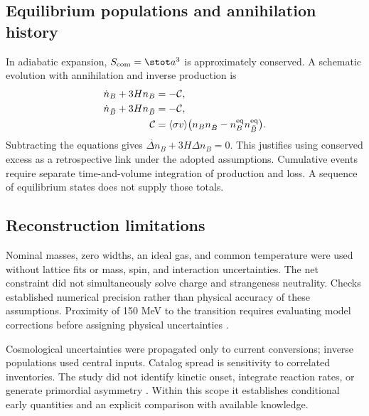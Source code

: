 \subsection{Equilibrium populations and annihilation history}
In adiabatic expansion, $S_{\rm com}=\stot a^3$ is approximately conserved. A schematic evolution with annihilation and inverse production is \citep{Satarov2013}
\begin{align}
\dot n_B+3Hn_B&=-\mathcal C,\\
\dot n_{\bar B}+3Hn_{\bar B}&=-\mathcal C,\\
\mathcal C&=\langle\sigma v\rangle
\bigl(n_Bn_{\bar B}-n_B^{\rm eq}n_{\bar B}^{\rm eq}\bigr).
\end{align}
Subtracting the equations gives $\dot{\Delta n}_B+3H\Delta n_B=0$. This justifies using conserved excess as a retrospective link under the adopted assumptions. Cumulative events require separate time-and-volume integration of production and loss. A sequence of equilibrium states does not supply those totals.

\subsection{Reconstruction limitations}
Nominal masses, zero widths, an ideal gas, and common temperature were used without lattice fits or mass, spin, and interaction uncertainties. The net constraint did not simultaneously solve charge and strangeness neutrality. Checks established numerical precision rather than physical accuracy of these assumptions. Proximity of 150 MeV to the transition requires evaluating model corrections before assigning physical uncertainties \citep{Bazavov2012}.

Cosmological uncertainties were propagated only to current conversions; inverse populations used central inputs. Catalog spread is sensitivity to correlated inventories. The study did not identify kinetic onset, integrate reaction rates, or generate primordial asymmetry \citep{Sakharov1967}. Within this scope it establishes conditional early quantities and an explicit comparison with available knowledge.
